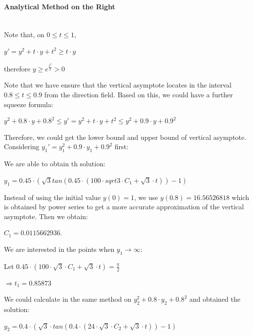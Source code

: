 \documentclass[11pt,a4paper]{article}
\begin{document}
\begin{multicols}{2}
	\small
	\paragraph{\small Analytical Method on the Right}
	
	~\\
	
	Note that, on $0\leq t \leq 1$,

	\begin{center}
		$y'=y^2+t \cdot y+t^2 \geq t \cdot y$

		therefore $y \geq e^{\frac{t^2}{2}}>0$
	\end{center}

	Note that we have ensure that the vertical asymptote locates in the interval $0.8\leq t \leq 0.9$ from the direction field. Based on this, we could have a further squeeze formula: 
	\begin{center}
		$y^2+0.8 \cdot y+0.8^2 \leq y' = y^2+t \cdot y+t^2 \leq y^2+0.9 \cdot y+0.9^2$
	\end{center}
	Therefore, we could get the lower bound and upper bound of vertical asymptote. Considering $y_1'=y_1^2+0.9 \cdot y_1+0.9^2$ first:

	We are able to obtain th solution:
	\begin{center}
		$y_1=0.45 \cdot (\sqrt3tan(0.45 \cdot (100 \cdot sqrt3 \cdot C_1+\sqrt{3} \cdot t))-1)$
	\end{center}
	Instead of using the initial value $y(0)=1$, we use $y(0.8)=16.56526818$ which is obtained by power series to get a more accurate approximation of the vertical asymptote. Then we obtain: 
	\begin{center}
		$C_1=0.0115662936$.
	\end{center}
	We are interested in the points when $y_1 \rightarrow \infty$:
	\begin{center}
		Let $0.45 \cdot (100 \cdot \sqrt3 \cdot C_1+\sqrt3 \cdot t)=\frac{\pi}{2}$ 
		
		$\Rightarrow t_1 = 0.85873$
	\end{center}

	We could calculate in the same method on $y_2^2+0.8 \cdot y_2+0.8^2$ and obtained the solution:

	\begin{center}
		$y_2=0.4 \cdot (\sqrt{3} \cdot tan(0.4 \cdot (24 \cdot \sqrt{3} \cdot C_2+\sqrt{3} \cdot t))-1)$
	\end{center}


\end{multicols}
\end{document}
